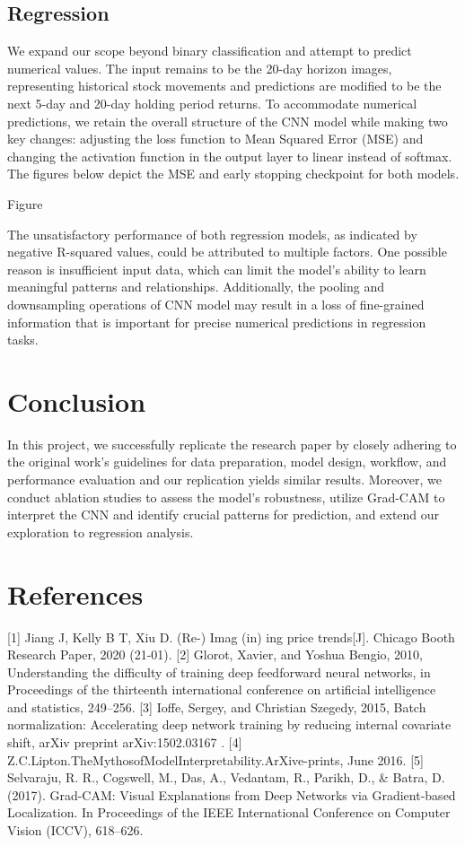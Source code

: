 \documentclass{article}
\begin{document}
{\subsection{Regression}
We expand our scope beyond binary classification and attempt to predict numerical values. The input remains to be the 20-day horizon images, representing historical stock movements and predictions are modified to be the next 5-day and 20-day holding period returns. To accommodate numerical predictions, we retain the overall structure of the CNN model while making two key changes: adjusting the loss function to Mean Squared Error (MSE) and changing the activation function in the output layer to linear instead of softmax. The figures below depict the MSE and early stopping checkpoint for both models.

Figure

The unsatisfactory performance of both regression models, as indicated by negative R-squared values, could be attributed to multiple factors. One possible reason is insufficient input data, which can limit the model's ability to learn meaningful patterns and relationships. Additionally, the pooling and downsampling operations of CNN model may result in a loss of fine-grained information that is important for precise numerical predictions in regression tasks.

\section{Conclusion}

In this project, we successfully replicate the research paper by closely adhering to the original work's guidelines for data preparation, model design, workflow, and performance evaluation and our replication yields similar results. Moreover, we conduct ablation studies to assess the model's robustness, utilize Grad-CAM to interpret the CNN and identify crucial patterns for prediction, and extend our exploration to regression analysis. 


\section*{References}

\medskip

\small


[1] Jiang J, Kelly B T, Xiu D. (Re-) Imag (in) ing price trends[J]. Chicago Booth Research Paper, 2020 (21-01).
[2] Glorot, Xavier, and Yoshua Bengio, 2010, Understanding the difficulty of training deep feedforward neural networks, in Proceedings of the thirteenth international conference on artificial intelligence and statistics, 249–256.
[3] Ioffe, Sergey, and Christian Szegedy, 2015, Batch normalization: Accelerating deep network training by reducing internal covariate shift, arXiv preprint arXiv:1502.03167 . 
[4] Z.C.Lipton.TheMythosofModelInterpretability.ArXive-prints, June 2016.
[5] Selvaraju, R. R., Cogswell, M., Das, A., Vedantam, R., Parikh, D., & Batra, D. (2017). Grad-CAM: Visual Explanations from Deep Networks via Gradient-based Localization. In Proceedings of the IEEE International Conference on Computer Vision (ICCV), 618–626.



}
\end{document}
